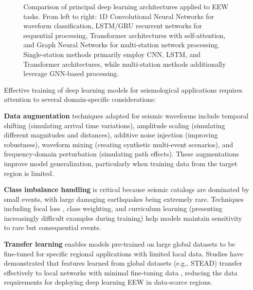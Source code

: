 \documentclass[review,authoryear]{elsarticle}
\begin{document}
\begin{figure}[H]
\caption{Comparison of principal deep learning architectures applied to EEW tasks. From left to right: 1D Convolutional Neural Networks for waveform classification, LSTM/GRU recurrent networks for sequential processing, Transformer architectures with self-attention, and Graph Neural Networks for multi-station network processing. Single-station methods primarily employ CNN, LSTM, and Transformer architectures, while multi-station methods additionally leverage GNN-based processing.}
\label{fig:architecture_comparison}
\end{figure}

Effective training of deep learning models for seismological applications requires attention to several domain-specific considerations:

\textbf{Data augmentation} techniques adapted for seismic waveforms include temporal shifting (simulating arrival time variations), amplitude scaling (simulating different magnitudes and distances), additive noise injection (improving robustness), waveform mixing (creating synthetic multi-event scenarios), and frequency-domain perturbation (simulating path effects). These augmentations improve model generalization, particularly when training data from the target region is limited.

\textbf{Class imbalance handling} is critical because seismic catalogs are dominated by small events, with large damaging earthquakes being extremely rare. Techniques including focal loss \citep{lin2018focal}, class weighting, and curriculum learning (presenting increasingly difficult examples during training) help models maintain sensitivity to rare but consequential events.

\textbf{Transfer learning} enables models pre-trained on large global datasets to be fine-tuned for specific regional applications with limited local data. Studies have demonstrated that features learned from global datasets (e.g., STEAD) transfer effectively to local networks with minimal fine-tuning data \citep{lapins2021deep}, reducing the data requirements for deploying deep learning EEW in data-scarce regions.
\end{document}
